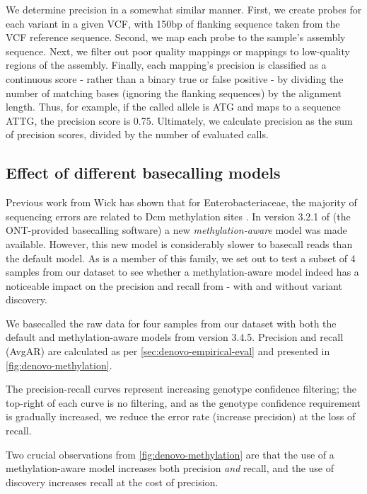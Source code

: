 We determine precision in a somewhat similar manner. First, we create probes for each variant in a given VCF, with 150bp of flanking sequence taken from the VCF reference sequence. Second, we map each probe to the sample's assembly sequence. Next, we filter out poor quality mappings or mappings to low-quality regions of the assembly. Finally, each mapping's precision is classified as a continuous score - rather than a binary true or false positive - by dividing the number of matching bases (ignoring the flanking sequences) by the alignment length. Thus, for example, if the called allele is ATG and maps to a sequence ATTG, the precision score is 0.75. Ultimately, we calculate precision as the sum of precision scores, divided by the number of evaluated calls.

\subsection{Effect of different \ont{} basecalling models}
\label{sec:denovo-methylation}

Previous work from Wick \etal{} has shown that for Enterobacteriaceae, the majority of \ont{} sequencing errors are related to Dcm methylation sites \cite{wick2019}. In version 3.2.1 of \guppy{} (the ONT-provided basecalling software) a new \emph{methylation-aware} model was made available. However, this new model is considerably slower to basecall reads than the default model. As \ecoli{} is a member of this family, we set out to test a subset of 4 samples from our dataset to see whether a methylation-aware model indeed has a noticeable impact on the precision and recall from \pandora{} - with and without \denovo{} variant discovery.

We basecalled the raw data for four samples from our dataset with both the default and methylation-aware models from \guppy{} version 3.4.5. Precision and recall (AvgAR) are calculated as per \autoref{sec:denovo-empirical-eval} and presented in \autoref{fig:denovo-methylation}. 

The precision-recall curves represent increasing genotype confidence filtering; the top-right of each curve is no filtering, and as the genotype confidence requirement is gradually increased, we reduce the error rate (increase precision) at the loss of recall. 

Two crucial observations from \autoref{fig:denovo-methylation} are that the use of a methylation-aware model increases both precision \emph{and} recall, and the use of \denovo{} discovery increases recall at the cost of precision. 

